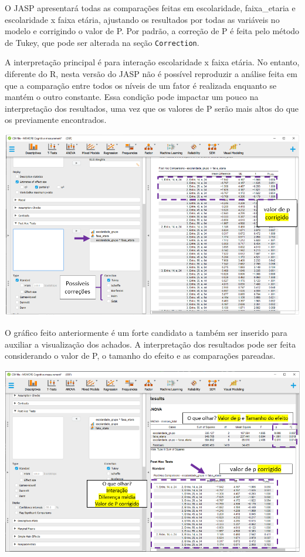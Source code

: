 \documentclass[
]{book}
\begin{document}
O JASP apresentará todas as comparações feitas em escolaridade,
faixa\_etaria e escolaridade x faixa etária, ajustando os resultados por
todas as variáveis no modelo e corrigindo o valor de P. Por padrão, a
correção de P é feita pelo método de Tukey, que pode ser alterada na
seção \texttt{Correction}.

A interpretação principal é para interação escolaridade x faixa etária.
No entanto, diferente do R, nesta versão do JASP não é possível
reproduzir a análise feita em que a comparação entre todos os níveis de
um fator é realizada enquanto se mantém o outro constante. Essa condição
pode impactar um pouco na interpretação dos resultados, uma vez que os
valores de P serão mais altos do que os previamente encontrados.

\includegraphics{./img/cap_anova_fatorial_posthoc3.png}

O gráfico feito anteriormente é um forte candidato a também ser inserido
para auxiliar a visualização dos achados. A interpretação dos resultados
pode ser feita considerando o valor de P, o tamanho do efeito e as
comparações pareadas.

\includegraphics{./img/cap_anova_fatorial_posthoc4.png}
\end{document}
